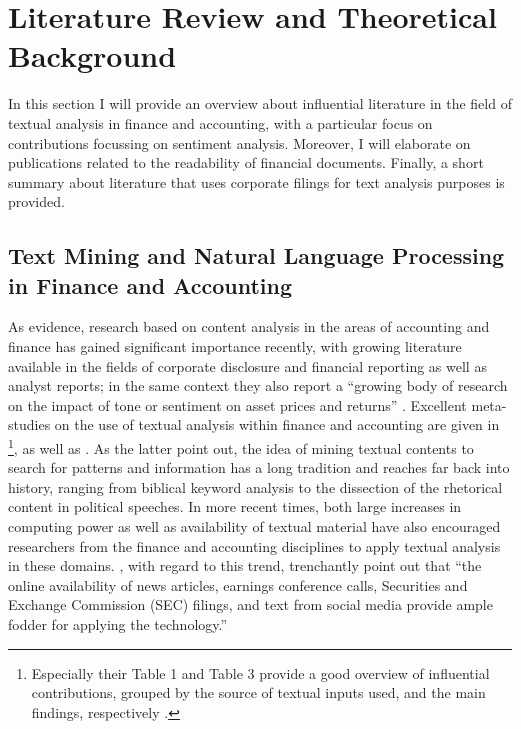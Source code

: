 \section{Literature Review and Theoretical Background}
\label{sec: lit_rev}

In this section I will provide an overview about influential literature in the field of textual analysis in finance and accounting, with a particular focus on contributions focussing on sentiment analysis. Moreover, I will elaborate on publications related to the readability of financial documents. Finally, a short summary about literature that uses corporate filings for text analysis purposes is provided. 


\subsection{Text Mining and Natural Language Processing in Finance and Accounting}
\label{ssec: lit_rev_TM_NLP}

As \textcite{YukselturkTucker2015} evidence, research based on content analysis in the areas of accounting and finance has gained significant importance recently, with growing literature available in the fields of corporate disclosure and financial reporting as well as analyst reports; in the same context they also report a \enquote{growing body of research on the impact of tone or sentiment on asset prices and returns} \parencite[871]{YukselturkTucker2015}. 
Excellent meta-studies on the use of textual analysis within finance and accounting are given in \textcite{KearneyLiu2014}\footnote{Especially their Table 1 and Table 3 provide a good overview of influential contributions, grouped by the source of textual inputs used, and the main findings, respectively \parencite[3, 12]{KearneyLiu2014}.}, \textcite{GuoShiTu2017} as well as \textcite{LM-meta-2016}. As the latter point out, the idea of mining textual contents to search for patterns and information has a long tradition and reaches far back into history, ranging from biblical keyword analysis to the dissection of the rhetorical content in political speeches. In more recent times, both large increases in computing power as well as availability of textual material have also encouraged researchers from the finance and accounting disciplines to apply textual analysis in these domains. \textcite[1188]{LM-meta-2016}, with regard to this trend,  trenchantly point out that \enquote{the online availability of news articles, earnings conference calls, Securities and Exchange Commission (SEC) filings, and text from social media provide ample fodder for applying the technology.}  

